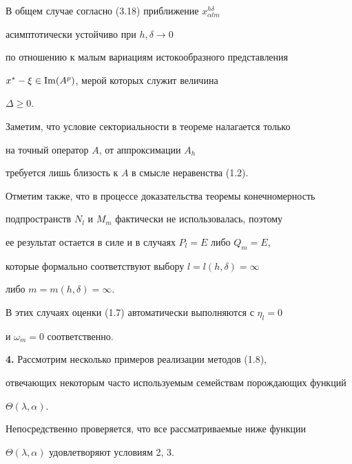 В общем случае согласно (3.18) приближение $x^{h \delta}_{\alpha l m}$


асимптотически устойчиво при $h, \delta \to 0$


по отношению к малым вариациям истокообразного представления


$ x^{*}- \xi \in \operatorname{Im} (A^p)$, мерой которых служит величина


$\Delta \geq 0$.





Заметим, что условие секториальности в теореме налагается только


на точный оператор $A$, от аппроксимации $A_h$


требуется лишь близость к $A$ в смысле неравенства (1.2).


Отметим также, что в процессе доказательства теоремы конечномерность


подпространств $N_l$ и $M_m$ фактически не использовалась, поэтому 


ее результат остается в силе и в случаях $P_l=E$ либо $Q_m=E$,


которые формально соответствуют выбору $l=l(h, \delta)= \infty$


либо $m=m(h, \delta)= \infty $.


В этих случаях оценки (1.7) автоматически выполняются с $\eta_l=0$


и $\omega_m=0$ соответственно.


\medskip





{\bf 4.} Рассмотрим несколько примеров реализации методов (1.8),


отвечающих некоторым часто используемым семействам порождающих функций


$\Theta(\lambda, \alpha)$.


Непосредственно проверяется, что все рассматриваемые ниже функции


$\Theta(\lambda, \alpha)$ удовлетворяют условиям 2, 3.





